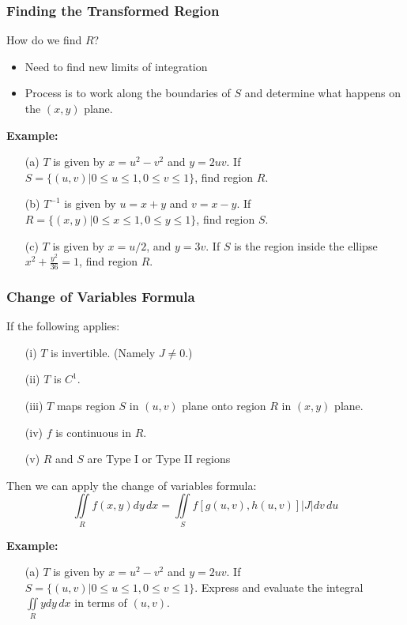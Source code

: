 \documentclass{beamer}
\begin{document}
\begin{frame}
\frametitle{Finding the Transformed Region}
How do we find $R$?
\begin{itemize}
	\item Need to find new limits of integration
	\item Process is to work along the boundaries of $S$ and determine what happens on the $(x,y)$ plane.
\end{itemize}
\textbf{Example:}
\begin{itemize}
	\item[(a)] $T$ is given by $x=u^2-v^2$ and $y=2uv$. If $S = \{ (u,v)| 0\leq u \leq 1, 0\leq v\leq1\}$, find region $R$.
	\item[(b)] $T^{-1}$ is given by $u=x+y$ and $v=x-y$. If $R = \{ (x,y)| 0\leq x \leq 1, 0\leq y\leq1\}$, find region $S$.
	\item[(c)] $T$ is given by $x=u/2$, and $y=3v$. If $S$ is the region inside the ellipse $x^2 + \frac{y^2}{36} = 1$, find region $R$. 
\end{itemize}
\end{frame}

\begin{frame}
\frametitle{Change of Variables Formula}
If the following applies:
\begin{itemize}
	\item[(i)] $T$ is invertible. (Namely $J \neq 0$.)
	\item [(ii)] $T$ is $C^1$.
	\item[(iii)] $T$ maps region $S$ in $(u,v)$ plane onto region $R$ in $(x,y)$ plane.
	\item[(iv)] $f$ is continuous in $R$.
	\item[(v)] $R$ and $S$ are Type I or Type II regions
\end{itemize}
\vspace{12pt}
Then we can apply the change of variables formula:
$$\iint\limits_{R} f(x,y)dy\,dx = \iint\limits_{S} f[g(u,v),h(u,v)] |J| dv\,du$$

\textbf{Example:}
\begin{itemize}
	\item[(a)] $T$ is given by $x=u^2-v^2$ and $y=2uv$. If $S = \{ (u,v)| 0\leq u \leq 1, 0\leq v\leq1\}$. Express and evaluate the integral $\iint\limits_{R} y dy\,dx$ in terms of $(u,v)$.
\end{itemize}
\end{frame}
\end{document}
